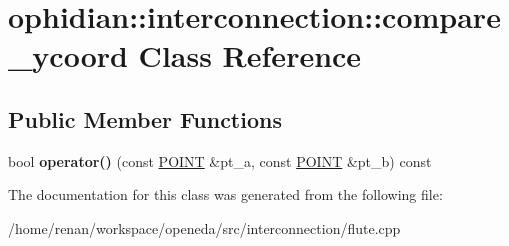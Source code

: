 \hypertarget{classophidian_1_1interconnection_1_1compare__ycoord}{\section{ophidian\-:\-:interconnection\-:\-:compare\-\_\-ycoord Class Reference}
\label{classophidian_1_1interconnection_1_1compare__ycoord}
}
\subsection*{Public Member Functions}
\begin{DoxyCompactItemize}
\item 
\hypertarget{classophidian_1_1interconnection_1_1compare__ycoord_a061fd2854fb580dde7b3160083479ece}{bool {\bfseries operator()} (const \hyperlink{structophidian_1_1interconnection_1_1point}{P\-O\-I\-N\-T} \&pt\-\_\-a, const \hyperlink{structophidian_1_1interconnection_1_1point}{P\-O\-I\-N\-T} \&pt\-\_\-b) const }\label{classophidian_1_1interconnection_1_1compare__ycoord_a061fd2854fb580dde7b3160083479ece}

\end{DoxyCompactItemize}


The documentation for this class was generated from the following file\-:\begin{DoxyCompactItemize}
\item 
/home/renan/workspace/openeda/src/interconnection/flute.\-cpp\end{DoxyCompactItemize}
